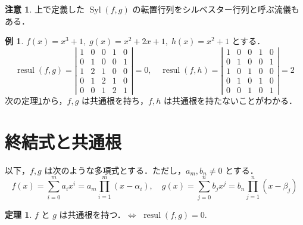 \documentclass[12pt, uplatex, dvipdfmx]{jsarticle}
\theoremstyle{definition}
\newtheorem{theorem}{定理}
\newtheorem{example}{例}
\newtheorem*{remark}{注意}
\DeclareMathOperator{\Syl}{Syl}
\DeclareMathOperator{\resul}{resul}
\begin{document}
\begin{remark}
  上で定義した $\Syl(f,g)$ の転置行列をシルベスター行列と呼ぶ流儀もある．
\end{remark}

\begin{example}\label{exmp:fgh}
  $f(x) = x^3+1, \; g(x)=x^2+2x+1, \; h(x) = x^2+1$ とする．
  \[
    \resul(f,g) = \left| 
      \begin{array}{ccccc}
        1 & 0 & 0 & 1 & 0\\
        0 & 1 & 0 & 0 & 1\\
        1 & 2 & 1 & 0 & 0\\
        0 & 1 & 2 & 1 & 0\\
        0 & 0 & 1 & 2 & 1
      \end{array}
    \right|=0, \quad \resul(f,h) = \left|
      \begin{array}{ccccc}
        1 & 0 & 0 & 1 & 0\\
        0 & 1 & 0 & 0 & 1\\
        1 & 0 & 1 & 0 & 0\\
        0 & 1 & 0 & 1 & 0\\
        0 & 0 & 1 & 0 & 1
      \end{array}
    \right|=2
  \]
  次の定理\ref{thm:common-solution}から，$f,g$ は共通根を持ち，$f,h$ は共通根を持たないことがわかる．
\end{example}

\section{終結式と共通根}

以下，$f,g$ は次のような多項式とする．ただし，$a_m, b_n \neq 0$ とする．
\[
  f(x)=\sum_{i=0}^{m} a_i x^i = a_m\prod_{i=1}^{m}(x-\alpha_i), \quad
  g(x)=\sum_{j=0}^{n} b_j x^j=b_n\prod_{j=1}^{n}(x-\beta_j)
\]

\begin{theorem}\label{thm:common-solution}
$f$ と $g$ は共通根を持つ．$\Longleftrightarrow$ \;$\resul(f,g)=0$.
\end{theorem}
\end{document}
